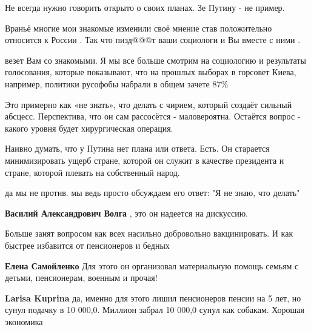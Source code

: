 \begin{itemize}
Не всегда нужно говорить открыто о своих планах. Зе Путину - не пример.


Враньё многие мои знакомые изменили своё мнение став положительно относится к
России . Так что пизд@@@т ваши социологи и Вы вместе с ними .

\begin{itemize} %

везет Вам со знакомыми. Я мы все больше смотрим на социологию и результаты
голосования, которые показывают, что на прошлых выборах в горсовет Киева,
например, политики русофобы набрали в общем зачете 87\%

\end{itemize} %


Это примерно как «не знать», что делать с чирием, который создаёт сильный абсцесс.
Перспектива, что он сам рассосётся - маловероятна. Остаётся вопрос - какого уровня будет хирургическая операция.


Наивно думать, что у Путина нет плана или ответа. Есть. Он старается
минимизировать ущерб стране, которой он служит в качестве президента и стране,
которой плевать на собственный народ.

\begin{itemize} %
да мы не против. мы ведь просто обсуждаем его ответ: "Я не знаю, что делать"

\textbf{Василий Александрович Волга} , это он надеется на дискуссию.
\end{itemize} %


Больше занят вопросом как всех насильно добровольно вакцинировать. И как
быстрее избавится от пенсионеров и бедных

\begin{itemize} %
\textbf{Елена Самойленко} Для этого он организовал материальную помощь семьям с детьми, пенсионерам, военным и прочая!

\textbf{Larisa Kuprina} да, именно для этого лишил пенсионеров пенсии на 5 лет, но сунул подачку в 10 000,0. Миллион забрал 10 000,0 сунул как собакам. Хорошая экономика
\end{itemize} %


\end{itemize}
